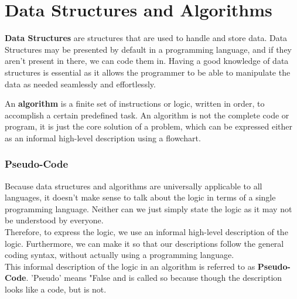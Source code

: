 \documentclass[12pt,a4paper]{article}
\theoremstyle{custom}
\begin{document}
\section{Data Structures and Algorithms}
\label{DSA}
 \textbf{Data Structures} are structures that are used to handle and store data. Data Structures may be presented by default in a programming language, and if they aren't present in there, we can code them in. Having a good knowledge of data structures is essential as it allows the programmer to be able to manipulate the data as needed seamlessly and effortlessly.\par
\vspace{3.5mm}
An \textbf{algorithm} is a finite set of instructions or logic, written in order, to accomplish a certain predefined task. An algorithm is not the complete code or program, it is just the core solution of a problem, which can be expressed either as an informal high-level description using a flowchart.

\subsubsection*{Pseudo-Code}
Because data structures and algorithms are universally applicable to all languages, it doesn't make sense to talk about the logic in terms of a single programming language. Neither can we just simply state the logic as it may not be understood by everyone. \\
Therefore, to express the logic, we use an informal high-level description of the logic. Furthermore, we can make it so that our descriptions follow the general coding syntax, without actually using a programming language.\\
This informal description of the logic in an algorithm is referred to as \textbf{Pseudo-Code}. 'Pseudo' means "False and is called so because though the description looks like a code, but is not.
\end{document}
